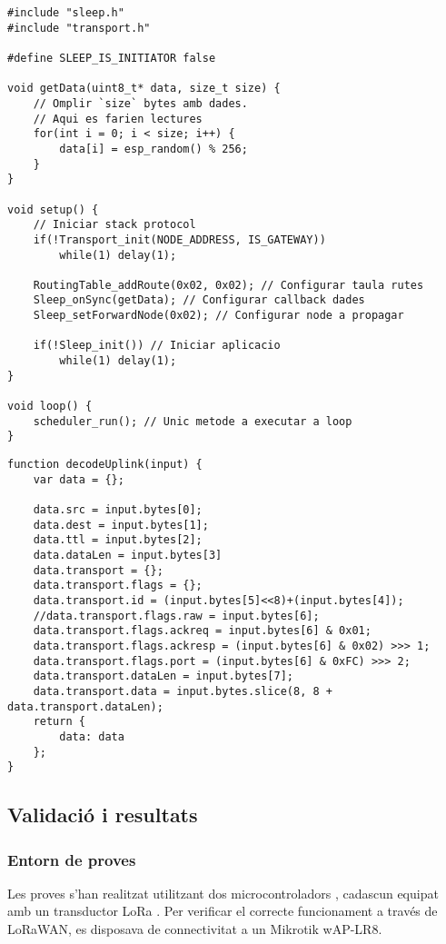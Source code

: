 \documentclass{tfgitic}[2024/07/01]
\begin{document}
{\begin{lstlisting}[style=cppStyle, caption={Exemple de funcionament mínim de l'aplicació de baix consum.}]
#include "sleep.h"
#include "transport.h"

#define SLEEP_IS_INITIATOR false

void getData(uint8_t* data, size_t size) {
    // Omplir `size` bytes amb dades.
    // Aqui es farien lectures
    for(int i = 0; i < size; i++) {
        data[i] = esp_random() % 256;
    }
}

void setup() {
    // Iniciar stack protocol
    if(!Transport_init(NODE_ADDRESS, IS_GATEWAY))
        while(1) delay(1);

    RoutingTable_addRoute(0x02, 0x02); // Configurar taula rutes
    Sleep_onSync(getData); // Configurar callback dades
    Sleep_setForwardNode(0x02); // Configurar node a propagar

    if(!Sleep_init()) // Iniciar aplicacio
        while(1) delay(1);
}

void loop() {
    scheduler_run(); // Unic metode a executar a loop
}
\end{lstlisting}

\begin{lstlisting}[style=jsStyle, caption={Exemple de descodificador de dades al servidor d'aplicació.}]
function decodeUplink(input) {
    var data = {};

    data.src = input.bytes[0];
    data.dest = input.bytes[1];
    data.ttl = input.bytes[2];
    data.dataLen = input.bytes[3]
    data.transport = {};
    data.transport.flags = {};
    data.transport.id = (input.bytes[5]<<8)+(input.bytes[4]);
    //data.transport.flags.raw = input.bytes[6];
    data.transport.flags.ackreq = input.bytes[6] & 0x01;
    data.transport.flags.ackresp = (input.bytes[6] & 0x02) >>> 1;
    data.transport.flags.port = (input.bytes[6] & 0xFC) >>> 2;
    data.transport.dataLen = input.bytes[7];
    data.transport.data = input.bytes.slice(8, 8 + data.transport.dataLen);
    return {
        data: data
    };
}
\end{lstlisting}

\subsection{Validació i resultats}
\subsubsection{Entorn de proves}
Les proves s'han realitzat utilitzant dos microcontroladors , cadascun equipat amb un transductor LoRa . Per verificar el correcte funcionament a través de LoRaWAN, es disposava de connectivitat a un  Mikrotik wAP-LR8.

}
\end{document}
